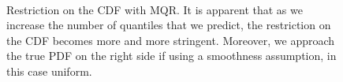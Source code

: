 \begin{figure}
    \centering
    \\

    \caption[Restriction on the CDF with MQR]{Restriction on the CDF with MQR. It is apparent that as we increase the number of quantiles that we predict, the restriction on the CDF becomes more and more stringent. Moreover, we approach the true PDF on the right side if using a smoothness assumption, in this case uniform.}
\end{figure}

